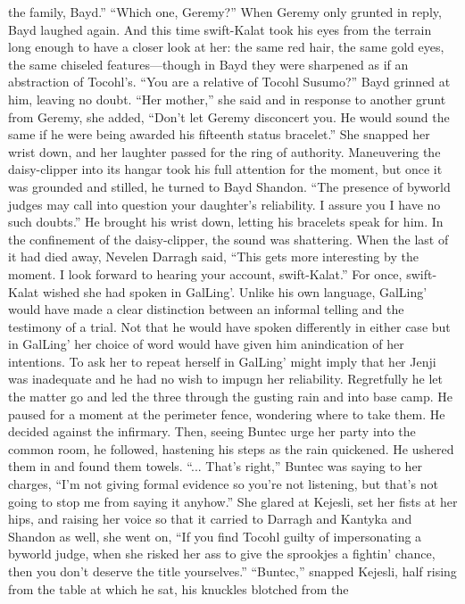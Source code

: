 \documentclass[9pt]{article}
\begin{document}
the family, Bayd.”
“Which one, Geremy?”
When Geremy only grunted in reply, Bayd laughed again. And this time swift-Kalat took his eyes
from the terrain long enough to have a closer look at her: the same red hair, the same gold eyes, the same
chiseled features—though in Bayd they were sharpened as if an abstraction of Tocohl’s.
“You are a relative of Tocohl Susumo?”
Bayd grinned at him, leaving no doubt. “Her mother,” she said and in response to another grunt from
Geremy, she added, “Don’t let Geremy disconcert you. He would sound the same if he were being
awarded his fifteenth status bracelet.” She snapped her wrist down, and her laughter passed for the ring
of authority.
Maneuvering the daisy-clipper into its hangar took his full attention for the moment, but once it was
grounded and stilled, he turned to Bayd Shandon. “The presence of byworld judges may call into
question your daughter’s reliability. I assure you I have no such doubts.” He brought his wrist down,
letting his bracelets speak for him. In the confinement of the daisy-clipper, the sound was shattering.
When the last of it had died away, Nevelen Darragh said, “This gets more interesting by the moment.
I look forward to hearing your account, swift-Kalat.”
For once, swift-Kalat wished she had spoken in GalLing’. Unlike his own language, GalLing’ would
have made a clear distinction between an informal telling and the testimony of a trial. Not that he would
have spoken differently in either case but in GalLing’ her choice of word would have given him anindication of her intentions. To ask her to repeat herself in GalLing’ might imply that her Jenji was
inadequate and he had no wish to impugn her reliability. Regretfully he let the matter go and led the three
through the gusting rain and into base camp.
He paused for a moment at the perimeter fence, wondering where to take them. He decided against
the infirmary. Then, seeing Buntec urge her party into the common room, he followed, hastening his steps
as the rain quickened.
He ushered them in and found them towels.
“... That’s right,” Buntec was saying to her charges, “I’m not giving formal evidence so you’re not
listening, but that’s not going to stop me from saying it anyhow.” She glared at Kejesli, set her fists at her
hips, and raising her voice so that it carried to Darragh and Kantyka and Shandon as well, she went on,
“If you find Tocohl guilty of impersonating a byworld judge, when she risked her ass to give the
sprookjes a fightin’ chance, then you don’t deserve the title yourselves.”
“Buntec,” snapped Kejesli, half rising from the table at which he sat, his knuckles blotched from the
\end{document}
